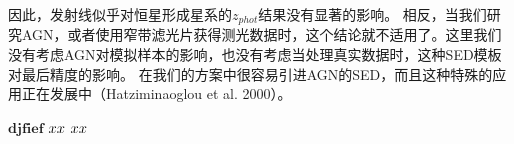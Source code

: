 因此，发射线似乎对恒星形成星系的$z_{phot}$结果没有显著的影响。
相反，当我们研究AGN，或者使用窄带滤光片获得测光数据时，这个结论就不适用了。这里我们没有考虑AGN对模拟样本的影响，也没有考虑当处理真实数据时，这种SED模板对最后精度的影响。
在我们的方案中很容易引进AGN的SED，而且这种特殊的应用正在发展中（Hatziminaoglou et al. 2000）。
 
$\mathbf{djfief}$%
$\romannumeral20$
$\uppercase\expandafter{\romannumeral20}$
 
